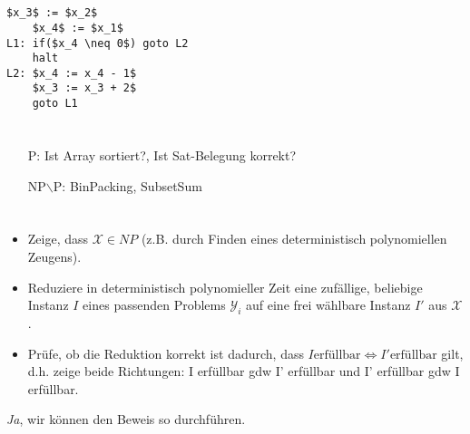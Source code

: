 \documentclass{article}
\begin{document}
\section{}%
\begin{lstlisting}[mathescape]
    $x_3$ := $x_2$
    $x_4$ := $x_1$
L1: if($x_4 \neq 0$) goto L2
    halt
L2: $x_4 := x_4 - 1$
    $x_3 := x_3 + 2$
    goto L1
\end{lstlisting}

\section{}%
\begin{center}
\end{center}
\begin{enumerate}
	\item[P:] Ist Array sortiert?, Ist Sat-Belegung korrekt?
  \item[NP$\backslash$P:] BinPacking, SubsetSum
\end{enumerate}

\section{}%
\begin{itemize}
	\item Zeige, dass $\mathcal{X}\in NP$ (z.B. durch Finden eines deterministisch polynomiellen Zeugens).
  \item Reduziere in deterministisch polynomieller Zeit eine zufällige, beliebige Instanz $I$ eines passenden Problems $\mathcal{Y}_i$ auf eine frei wählbare Instanz $I'$ aus $\mathcal{X}$.
  \item Prüfe, ob die Reduktion korrekt ist dadurch, dass $I \text{erfüllbar} \Leftrightarrow I' \text{erfüllbar}$ gilt, d.h. zeige beide Richtungen: I erfüllbar gdw I' erfüllbar und I' erfüllbar gdw I erfüllbar.
\end{itemize}
\emph{Ja}, wir können den Beweis so durchführen.
\end{document}
